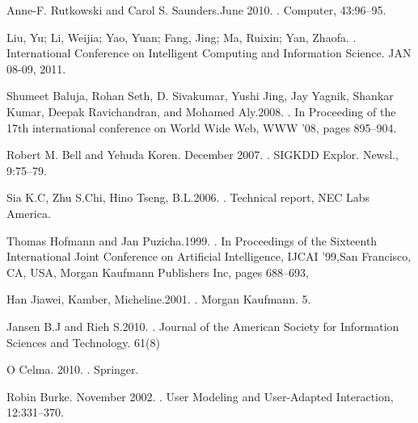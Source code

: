 \begin{thebibliography}{10}
Anne-F. Rutkowski and Carol S. Saunders.June 2010.
.
\newblock Computer, 43:96–95.

Liu, Yu; Li, Weijia; Yao, Yuan; Fang, Jing; Ma, Ruixin; Yan, Zhaofa.
.
\newblock International Conference on Intelligent Computing and Information Science. JAN 08-09, 2011.

Shumeet Baluja, Rohan Seth, D. Sivakumar, Yushi Jing, Jay Yagnik, Shankar Kumar, Deepak Ravichandran, and Mohamed Aly.2008.
.
\newblock In Proceeding of the 17th international conference on World Wide Web, WWW ’08, pages 895–904.

Robert M. Bell and Yehuda Koren. December 2007.
.
\newblock SIGKDD Explor. Newsl., 9:75–79.

Sia K.C, Zhu S.Chi, Hino Tseng, B.L.2006.
.
\newblock Technical report, NEC Labs America. 

Thomas Hofmann and Jan Puzicha.1999. 
.
\newblock In Proceedings of the Sixteenth International Joint Conference on Artificial Intelligence, IJCAI ’99,San Francisco, CA, USA, Morgan Kaufmann Publishers Inc, pages 688–693, 

Han Jiawei, Kamber, Micheline.2001.
.
\newblock Morgan Kaufmann. 5.

Jansen B.J and Rieh S.2010.
.
\newblock Journal of the American Society for Information Sciences and Technology. 61(8)

O Celma. 2010.
.
\newblock Springer. 

Robin Burke. November 2002.
.
\newblock User Modeling and User-Adapted Interaction, 12:331–370.


\end{thebibliography}
